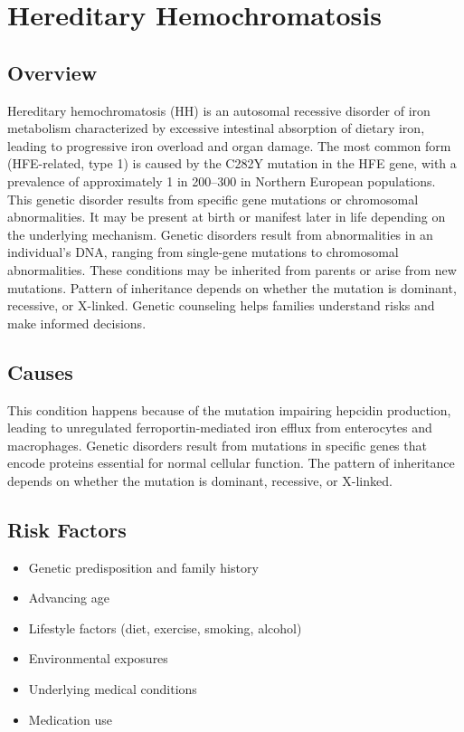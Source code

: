 \chapter{Hereditary Hemochromatosis}
\label{sec:nutrition:Hereditary Hemochromatosis}

\section{Overview}
Hereditary hemochromatosis (HH) is an autosomal recessive disorder of iron metabolism characterized by excessive intestinal absorption of dietary iron, leading to progressive iron overload and organ damage. The most common form (HFE-related, type 1) is caused by the C282Y mutation in the HFE gene, with a prevalence of approximately 1 in 200--300 in Northern European populations. This genetic disorder results from specific gene mutations or chromosomal abnormalities. It may be present at birth or manifest later in life depending on the underlying mechanism. Genetic disorders result from abnormalities in an individual's DNA, ranging from single-gene mutations to chromosomal abnormalities. These conditions may be inherited from parents or arise from new mutations. Pattern of inheritance depends on whether the mutation is dominant, recessive, or X-linked. Genetic counseling helps families understand risks and make informed decisions.
\section{Causes}
This condition happens because of the mutation impairing hepcidin production, leading to unregulated ferroportin-mediated iron efflux from enterocytes and macrophages. Genetic disorders result from mutations in specific genes that encode proteins essential for normal cellular function. The pattern of inheritance depends on whether the mutation is dominant, recessive, or X-linked.   
\section{Risk Factors}

\begin{itemize}[noitemsep]
  \item Genetic predisposition and family history
  \item Advancing age
  \item Lifestyle factors (diet, exercise, smoking, alcohol)
  \item Environmental exposures
  \item Underlying medical conditions
  \item Medication use
\end{itemize}
